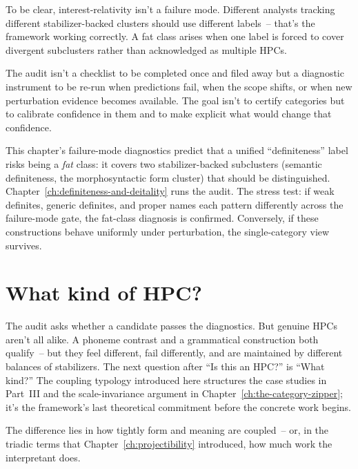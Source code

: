 \noindent To be clear, interest-relativity isn't a failure mode. Different analysts tracking different stabilizer-backed clusters should use different labels~-- that's the framework working correctly. A fat class arises when one label is forced to cover divergent subclusters rather than acknowledged as multiple HPCs.

The audit isn't a checklist to be completed once and filed away but a diagnostic instrument to be re-run when predictions fail, when the scope shifts, or when new perturbation evidence becomes available. The goal isn't to certify categories but to calibrate confidence in them and to make explicit what would change that confidence.

\begin{definitenessthread}
This chapter's failure-mode diagnostics predict that a unified \enquote{definiteness} label risks being a \emph{fat} class: it covers two stabilizer-backed subclusters (semantic definiteness, the morphosyntactic form cluster) that should be distinguished. Chapter~\ref{ch:definiteness-and-deitality} runs the audit. The stress test: if weak definites, generic definites, and proper names each pattern differently across the failure-mode gate, the fat-class diagnosis is confirmed. Conversely, if these constructions behave uniformly under perturbation, the single-category view survives.
\end{definitenessthread}


\section{What kind of HPC?}
\label{sec:8:coupling}

The audit asks whether a candidate passes the diagnostics. But genuine HPCs aren't all alike. A phoneme contrast and a grammatical construction both qualify~-- but they feel different, fail differently, and are maintained by different balances of stabilizers. The next question after \enquote{Is this an HPC?} is \enquote{What kind?} The coupling typology introduced here structures the case studies in Part~III and the scale-invariance argument in Chapter~\ref{ch:the-category-zipper}; it's the framework's last theoretical commitment before the concrete work begins.

The difference lies in how tightly form and meaning are coupled~-- or, in the triadic terms that Chapter~\ref{ch:projectibility} introduced, how much work the interpretant does.

